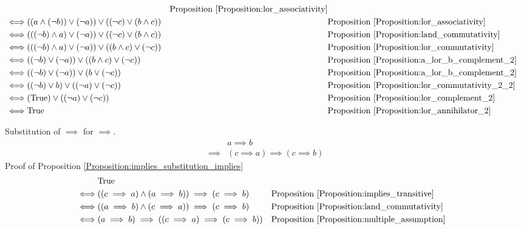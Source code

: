 \begin{prop}
\begin{align*}
& & \text{Proposition \ref{Proposition:lor_associativity}} \\
\iff & ((a \land (\lnot b)) \lor (\lnot a)) \lor ((\lnot c) \lor (b \land c))
& & \text{Proposition \ref{Proposition:lor_associativity}} \\
\iff & (((\lnot b) \land a) \lor (\lnot a)) \lor ((\lnot c) \lor (b \land c))
& & \text{Proposition \ref{Proposition:land_commutativity}} \\
\iff & (((\lnot b) \land a) \lor (\lnot a)) \lor ((b \land c) \lor (\lnot c))
& & \text{Proposition \ref{Proposition:lor_commutativity}} \\
\iff & ((\lnot b) \lor (\lnot a)) \lor ((b \land c) \lor (\lnot c))
& & \text{Proposition \ref{Proposition:a_lor_b_complement_2}} \\
\iff & ((\lnot b) \lor (\lnot a)) \lor (b \lor (\lnot c))
& & \text{Proposition \ref{Proposition:a_lor_b_complement_2}} \\
\iff & ((\lnot b) \lor b) \lor ((\lnot a) \lor (\lnot c))
& & \text{Proposition \ref{Proposition:lor_commutativity_2_2}} \\
\iff & (\text{True}) \lor ((\lnot a) \lor (\lnot c))
& & \text{Proposition \ref{Proposition:lor_complement_2}} \\
\iff & \text{True}
& & \text{Proposition \ref{Proposition:lor_annihilator_2}} \\
\end{align*}
\end{prop}

\begin{prop}
\label{Proposition:implies_substitution_implies}
Substitution of $\implies$ for $\implies$.
\begin{align*}
& a \implies b \\
\implies & (c \implies a) \implies (c \implies b)
\end{align*}
Proof of Proposition \ref{Proposition:implies_substitution_implies}
\begin{align*}
& \text{True} \\
\iff & ((c \implies a) \land (a \implies b)) \implies (c \implies b)
& & \text{Proposition \ref{Proposition:implies_transitive}} \\
\iff & ((a \implies b) \land (c \implies a)) \implies (c \implies b)
& & \text{Proposition \ref{Proposition:land_commutativity}} \\
\iff & (a \implies b) \implies ((c \implies a) \implies (c \implies b))
& & \text{Proposition \ref{Proposition:multiple_assumption}} \\
\end{align*}
\end{prop}


